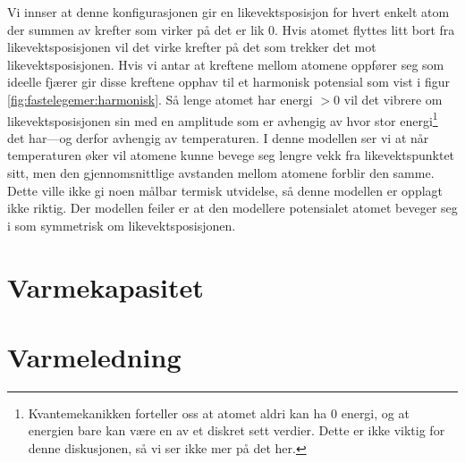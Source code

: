 Vi innser at denne konfigurasjonen gir en likevektsposisjon for hvert enkelt atom der summen av krefter som virker på det er lik 0. Hvis atomet flyttes litt bort fra likevektsposisjonen vil det virke krefter på det som trekker det mot likevektsposisjonen. Hvis vi antar at kreftene mellom atomene oppfører seg som ideelle fjærer gir disse kreftene opphav til et harmonisk potensial som vist i figur \ref{fig:fastelegemer:harmonisk}. Så lenge atomet har energi $> 0$ vil det vibrere om likevektsposisjonen sin med en amplitude som er avhengig av hvor stor energi\footnote{Kvantemekanikken forteller oss at atomet aldri kan ha 0 energi, og at energien bare kan være en av et diskret sett verdier. Dette er ikke viktig for denne diskusjonen, så vi ser ikke mer på det her.} det har---og derfor avhengig av temperaturen. 
I denne modellen ser vi at når temperaturen øker vil atomene kunne bevege seg lengre vekk fra likevektspunktet sitt, men den gjennomsnittlige avstanden mellom atomene forblir den samme. Dette ville ikke gi noen målbar termisk utvidelse, så denne modellen er opplagt ikke riktig. Der modellen feiler er at den modellere potensialet atomet beveger seg i som symmetrisk om likevektsposisjonen. 

\section{Varmekapasitet}

\section{Varmeledning}